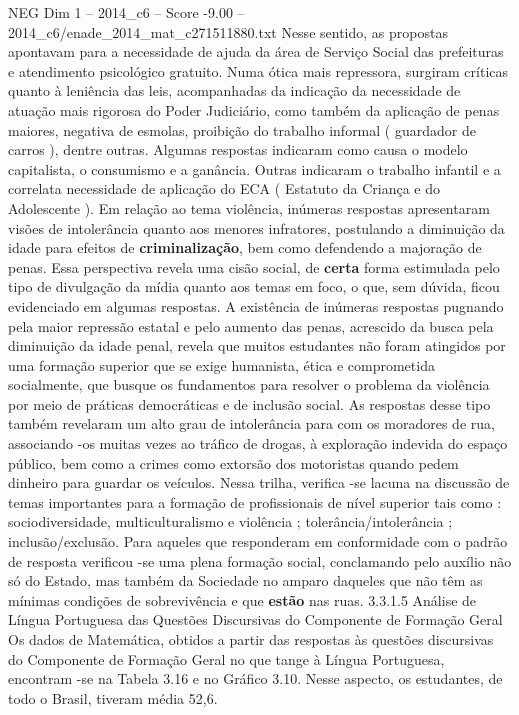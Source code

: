 \begin{textsample}{NEG Dim 1 – 2014\_c6 – Score -9.00 – 2014\_c6/enade\_2014\_mat\_c271511880.txt}
Nesse sentido, as propostas apontavam para a necessidade de ajuda da área de Serviço Social das prefeituras e atendimento psicológico gratuito.
Numa ótica mais repressora, surgiram críticas quanto à leniência das leis, acompanhadas da indicação da necessidade de atuação mais rigorosa do Poder Judiciário, como também da aplicação de penas maiores, negativa de esmolas, proibição do trabalho informal ( guardador de carros ), dentre outras.
Algumas respostas indicaram como causa o modelo capitalista, o consumismo e a ganância.
Outras indicaram o trabalho infantil e a correlata necessidade de aplicação do ECA ( Estatuto da Criança e do Adolescente ).
Em relação ao tema violência, inúmeras respostas apresentaram visões de intolerância quanto aos menores infratores, postulando a diminuição da idade para efeitos de \textbf{criminalização}, bem como defendendo a majoração de penas.
Essa perspectiva revela uma cisão social, de \textbf{certa} forma estimulada pelo tipo de divulgação da mídia quanto aos temas em foco, o que, sem dúvida, ficou evidenciado em algumas respostas.
A existência de inúmeras respostas pugnando pela maior repressão estatal e pelo aumento das penas, acrescido da busca pela diminuição da idade penal, revela que muitos estudantes não foram atingidos por uma formação superior que se exige humanista, ética e comprometida socialmente, que busque os fundamentos para resolver o problema da violência por meio de práticas democráticas e de inclusão social.
As respostas desse tipo também revelaram um alto grau de intolerância para com os moradores de rua, associando -os muitas vezes ao tráfico de drogas, à exploração indevida do espaço público, bem como a crimes como extorsão dos motoristas quando pedem dinheiro para guardar os veículos.
Nessa trilha, verifica -se lacuna na discussão de temas importantes para a formação de profissionais de nível superior tais como : sociodiversidade, multiculturalismo e violência ; tolerância/intolerância ; inclusão/exclusão.
Para aqueles que responderam em conformidade com o padrão de resposta verificou -se uma plena formação social, conclamando pelo auxílio não só do Estado, mas também da Sociedade no amparo daqueles que não têm as mínimas condições de sobrevivência e que \textbf{estão} nas ruas. 3.3.1.5 Análise de Língua Portuguesa das Questões Discursivas do Componente de Formação Geral Os dados de Matemática, obtidos a partir das respostas às questões discursivas do Componente de Formação Geral no que tange à Língua Portuguesa, encontram -se na Tabela 3.16 e no Gráfico 3.10.
Nesse aspecto, os estudantes, de todo o Brasil, tiveram média 52,6.

\end{textsample}
